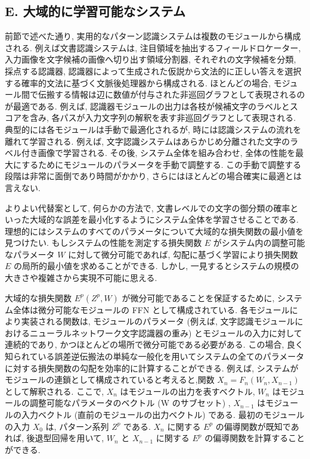 \documentclass[twocolumn]{jarticle}     %
\begin{document}
\subsection*{E. 大域的に学習可能なシステム}

前節で述べた通り, 実用的なパターン認識システムは複数のモジュールから構成される. 例えば文書認識システムは, 注目領域を抽出するフィールドロケーター, 入力画像を文字候補の画像へ切り出す領域分割器, それぞれの文字候補を分類, 採点する認識器, 認識器によって生成された仮説から文法的に正しい答えを選択する確率的文法に基づく文脈後処理器から構成される.
ほとんどの場合, モジュール間で伝搬する情報は辺に数値が付与された非巡回グラフとして表現されるのが最適である. 例えば, 認識器モジュールの出力は各枝が候補文字のラベルとスコアを含み, 各パスが入力文字列の解釈を表す非巡回グラフとして表現される. 典型的には各モジュールは手動で最適化されるが, 時には認識システムの流れを離れて学習される.
例えば, 文字認識システムはあらかじめ分離された文字のラベル付き画像で学習される. その後, システム全体を組み合わせ, 全体の性能を最大にするためにモジュールのパラメータを手動で調整する. この手動で調整する段階は非常に面倒であり時間がかかり, さらにはほとんどの場合確実に最適とは言えない.
\par
よりよい代替案として, 何らかの方法で, 文書レベルでの文字の御分類の確率といった大域的な誤差を最小化するようにシステム全体を学習させることである.理想的にはシステムのすべてのパラメータについて大域的な損失関数の最小値を見つけたい. もしシステムの性能を測定する損失関数 $E$ がシステム内の調整可能なパラメータ $W$ に対して微分可能であれば, 勾配に基づく学習により損失関数 $E$ の局所的最小値を求めることができる.
しかし, 一見するとシステムの規模の大きさや複雑さから実現不可能に思える.
\par
大域的な損失関数 $E^p (Z^p , W)$ が微分可能であることを保証するために, システム全体は微分可能なモジュールの FFN として構成されている. 各モジュールにより実装される関数は, モジュールのパラメータ (例えば, 文字認識モジュールにおけるニューラルネットワーク文字認識器の重み) とモジュールの入力に対して連続的であり, かつほとんどの場所で微分可能である必要がある.
この場合, 良く知られている誤差逆伝搬法の単純な一般化を用いてシステムの全てのパラメータに対する損失関数の勾配を効率的に計算することができる.
例えば,  システムがモジュールの連鎖として構成されていると考えると,関数 $X_n = F_n (W_n , X_{n-1})$ として解釈される.
ここで, $X_n$ はモジュールの出力を表すベクトル, $W_n$ はモジュールの調整可能なパラメータのベクトル (W のサブセット) , $X_{n-1}$ はモジュールの入力ベクトル (直前のモジュールの出力ベクトル) である.
最初のモジュールの入力 $X_0$ は, パターン系列 $Z^p$ である. $X_n$ に関する $E^p$ の偏導関数が既知であれば, 後退型回帰を用いて, $W_n$ と $X_{n-1}$ に関する $E^p$ の偏導関数を計算することができる.
\end{document}

